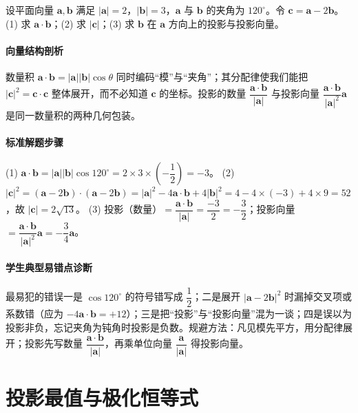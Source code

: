 \begin{problem}
设平面向量 $\bm a,\bm b$ 满足 $|\bm a|=2$，$|\bm b|=3$，$\bm a$ 与 $\bm b$ 的夹角为 $120^\circ$。令 $\bm c=\bm a-2\bm b$。(1) 求 $\bm a\cdot\bm b$；(2) 求 $|\bm c|$；(3) 求 $\bm b$ 在 $\bm a$ 方向上的投影与投影向量。
\end{problem}
\begin{solution}
\paragraph{向量结构剖析}
数量积 $\bm a\cdot\bm b=|\bm a||\bm b|\cos\theta$ 同时编码“模”与“夹角”；其分配律使我们能把 $|\bm c|^2=\bm c\cdot\bm c$ 整体展开，而不必知道 $\bm c$ 的坐标。投影的数量 $\dfrac{\bm a\cdot\bm b}{|\bm a|}$ 与投影向量 $\dfrac{\bm a\cdot\bm b}{|\bm a|^2}\bm a$ 是同一数量积的两种几何包装。
\paragraph{标准解题步骤}
(1) $\bm a\cdot\bm b=|\bm a||\bm b|\cos120^\circ=2\times3\times\left(-\dfrac12\right)=-3$。
(2) $|\bm c|^2=(\bm a-2\bm b)\cdot(\bm a-2\bm b)=|\bm a|^2-4\bm a\cdot\bm b+4|\bm b|^2=4-4\times(-3)+4\times9=52$，故 $|\bm c|=2\sqrt{13}$。
(3) 投影（数量）$=\dfrac{\bm a\cdot\bm b}{|\bm a|}=\dfrac{-3}{2}=-\dfrac32$；投影向量 $=\dfrac{\bm a\cdot\bm b}{|\bm a|^2}\bm a=-\dfrac34\bm a$。
\paragraph{学生典型易错点诊断}
最易犯的错误一是 $\cos120^\circ$ 的符号错写成 $\dfrac12$；二是展开 $|\bm a-2\bm b|^2$ 时漏掉交叉项或系数错（应为 $-4\bm a\cdot\bm b=+12$）；三是把“投影”与“投影向量”混为一谈；四是误以为投影非负，忘记夹角为钝角时投影是负数。规避方法：凡见模先平方，用分配律展开；投影先写数量 $\dfrac{\bm a\cdot\bm b}{|\bm a|}$，再乘单位向量 $\dfrac{\bm a}{|\bm a|}$ 得投影向量。
\end{solution}

\section{投影最值与极化恒等式}

